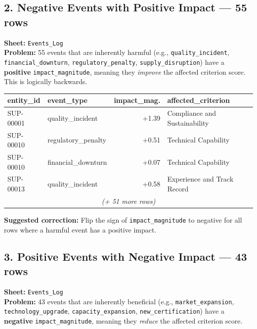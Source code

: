 \documentclass[11pt]{article}
\begin{document}
\bigskip

\subsection*{2. Negative Events with Positive Impact --- 55 rows}
\textbf{Sheet:} \texttt{Events\_Log}\\
\textbf{Problem:} 55 events that are inherently harmful (e.g., \texttt{quality\_incident}, \texttt{financial\_downturn}, \texttt{regulatory\_penalty}, \texttt{supply\_disruption}) have a \textbf{positive} \texttt{impact\_magnitude}, meaning they \emph{improve} the affected criterion score. This is logically backwards.

\begin{center}
\begin{tabular}{llrl}
\toprule
\textbf{entity\_id} & \textbf{event\_type} & \textbf{impact\_mag.} & \textbf{affected\_criterion} \\
\midrule
SUP-00001 & quality\_incident & \textcolor{critred}{+1.39} & Compliance and Sustainability \\
SUP-00010 & regulatory\_penalty & \textcolor{critred}{+0.51} & Technical Capability \\
SUP-00010 & financial\_downturn & \textcolor{critred}{+0.07} & Technical Capability \\
SUP-00013 & quality\_incident & \textcolor{critred}{+0.58} & Experience and Track Record \\
\multicolumn{4}{c}{\emph{(+ 51 more rows)}} \\
\bottomrule
\end{tabular}
\end{center}

\noindent\textbf{Suggested correction:} Flip the sign of \texttt{impact\_magnitude} to negative for all rows where a harmful event has a positive impact.

\bigskip

\subsection*{3. Positive Events with Negative Impact --- 43 rows}
\textbf{Sheet:} \texttt{Events\_Log}\\
\textbf{Problem:} 43 events that are inherently beneficial (e.g., \texttt{market\_expansion}, \texttt{technology\_upgrade}, \texttt{capacity\_expansion}, \texttt{new\_certification}) have a \textbf{negative} \texttt{impact\_magnitude}, meaning they \emph{reduce} the affected criterion score.
\end{document}
